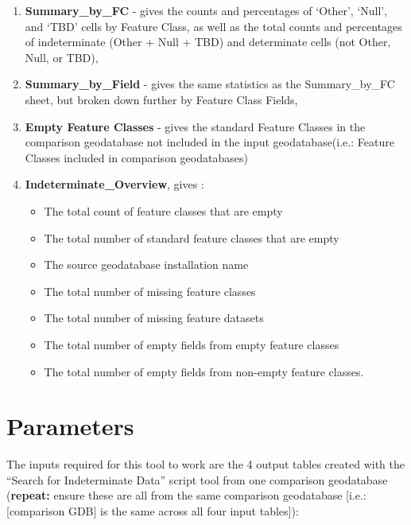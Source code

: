 \documentclass[openany]{book}
\providecommand{\tightlist}{%
  \setlength{\itemsep}{0pt}\setlength{\parskip}{0pt}}
\theoremstyle{definition}
\theoremstyle{definition}
\theoremstyle{definition}
\theoremstyle{remark}
\begin{document}
\begin{enumerate}
\def\labelenumi{\arabic{enumi}.}
\tightlist
\item
  \textbf{Summary\_by\_FC} - gives the counts and percentages of
  `Other', `Null', and `TBD' cells by Feature Class, as well as the
  total counts and percentages of indeterminate (Other + Null + TBD) and
  determinate cells (not Other, Null, or TBD),
\item
  \textbf{Summary\_by\_Field} - gives the same statistics as the
  Summary\_by\_FC sheet, but broken down further by Feature Class
  Fields,
\item
  \textbf{Empty Feature Classes} - gives the standard Feature Classes in
  the comparison geodatabase not included in the input geodatabase(i.e.:
  Feature Classes included in comparison geodatabases)
\item
  \textbf{Indeterminate\_Overview}, gives :

  \begin{itemize}
  \tightlist
  \item
    The total count of feature classes that are empty
  \item
    The total number of standard feature classes that are empty
  \item
    The source geodatabase installation name
  \item
    The total number of missing feature classes
  \item
    The total number of missing feature datasets
  \item
    The total number of empty fields from empty feature classes
  \item
    The total number of empty fields from non-empty feature classes.
  \end{itemize}
\end{enumerate}

\section{Parameters}\label{parameters-9}

The inputs required for this tool to work are the 4 output tables
created with the ``Search for Indeterminate Data'' script tool from one
comparison geodatabase (\textbf{repeat:} ensure these are all from the
same comparison geodatabase {[}i.e.: {[}comparison GDB{]} is the same
across all four input tables{]}):
\end{document}
